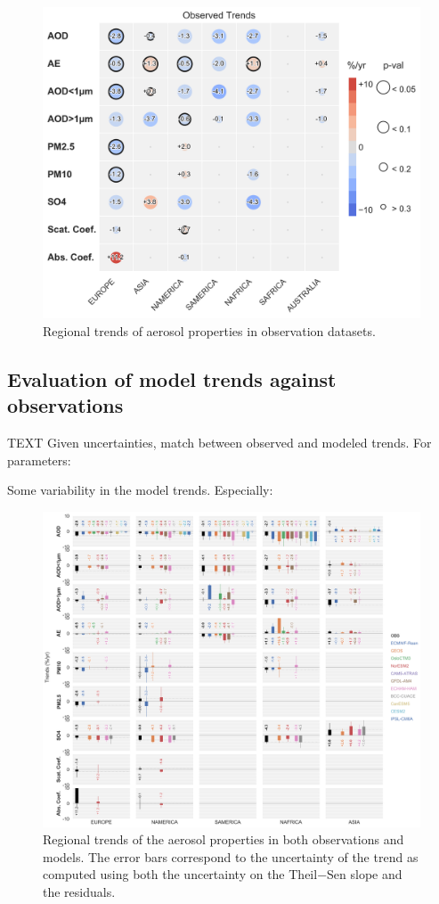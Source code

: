 \documentclass[journal abbreviation, manuscript]{copernicus}
\begin{document}
\begin{figure}
 \includegraphics[width=\columnwidth]{../scripts/figs/heatmaps/OBS.png}
 \caption{Regional trends of aerosol properties in observation datasets.}
 \label{obs_trends}
\end{figure}


\subsection{Evaluation of model trends against observations}
TEXT
Given uncertainties, match between observed and modeled trends. For parameters:

Some variability in the model trends. Especially:


\begin{figure}
 \includegraphics[width=\columnwidth]{../scripts/figs/heatmaps/BARS.png}
 \caption{Regional trends of the aerosol properties in both observations and models. The error bars correspond to the uncertainty of the trend as computed using both the uncertainty on the Theil−Sen slope and the residuals.}
 \label{bars}
\end{figure}
\end{document}
